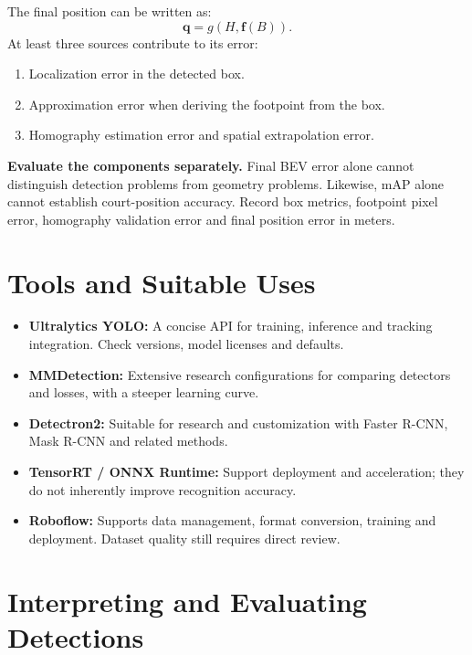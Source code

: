 \documentclass[11pt,a4paper,oneside]{report}
\begin{document}
The final position can be written as:
\[
\mathbf q=g(H,\mathbf f(B)).
\]
At least three sources contribute to its error:

\begin{enumerate}
  \item Localization error in the detected box.
  \item Approximation error when deriving the footpoint from the box.
  \item Homography estimation error and spatial extrapolation error.
\end{enumerate}

\begin{plainBox}
\textbf{Evaluate the components separately.}\quad
Final BEV error alone cannot distinguish detection problems from geometry problems. Likewise, mAP alone cannot establish court-position accuracy. Record box metrics, footpoint pixel error, homography validation error and final position error in meters.
\end{plainBox}

\section{Tools and Suitable Uses}

\begin{toolBox}
\begin{itemize}
  \item \textbf{Ultralytics YOLO:} A concise API for training, inference and tracking integration. Check versions, model licenses and defaults.
  \item \textbf{MMDetection:} Extensive research configurations for comparing detectors and losses, with a steeper learning curve.
  \item \textbf{Detectron2:} Suitable for research and customization with Faster R-CNN, Mask R-CNN and related methods.
  \item \textbf{TensorRT / ONNX Runtime:} Support deployment and acceleration; they do not inherently improve recognition accuracy.
  \item \textbf{Roboflow:} Supports data management, format conversion, training and deployment. Dataset quality still requires direct review.
\end{itemize}
\end{toolBox}

\section{Interpreting and Evaluating Detections}
\end{document}
